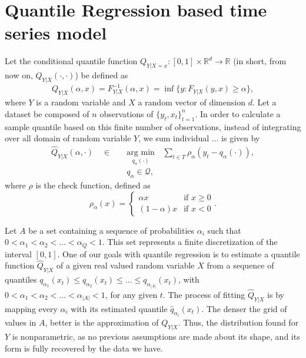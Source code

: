 \section{Quantile Regression based time series model}

Let the conditional quantile function $Q_{Y|X=x}:[0,1] \times \mathbb{R}^d \rightarrow \mathbb{R}$ (in short, from now on, $Q_{Y|X}(\cdot, \cdot)$) be defined as 
\begin{equation}
Q_{Y|X}(\alpha,x) = F_{Y|X}^{-1}(\alpha,x) = \inf\{y: F_{Y|X}(y,x) \geq \alpha\},
\label{eq:quantile-function}
\end{equation}
where $Y$ is a random variable and $X$ a random vector of dimension $d$. 
Let a dataset be composed of $n$ observations of $\{y_t,x_t \}_{t=1}^n$. In order to calculate a sample quantile based on this finite number of observations, instead of integrating over all domain of random variable $Y$, we sum individual ... is given by 
\begin{eqnarray}
\hat{Q}_{Y|X}(\alpha,\cdot)\quad\in\quad & \underset{q_{\alpha}(\cdot)}{\text{arg min}}\, & \sum_{t\in T}\rho_{\alpha}(y_{t}-q_{\alpha}(\cdot)),\label{eq:optim-qr1} \\
 & q_{\alpha}\in\mathcal{Q},\label{eq:optim-qr2}
\end{eqnarray}
where $\rho$ is the check function, defined as
\begin{equation}\label{eq:check-function}
\rho_{\alpha}(x)=\begin{cases}
\alpha x & \text{if }x\geq0\\
(1-\alpha)x & \text{if }x<0
\end{cases}.
\end{equation}



Let $A$ be a set containing a sequence of probabilities  $\alpha_i$ such that $0 < \alpha_1 < \alpha_2 < \dots < \alpha_Q < 1$. This set represents a finite discretization of the interval $[0,1]$.
One of our goals with quantile regression is to estimate a quantile function $\hat{Q}_{Y|X}$ of a given real valued random variable $X$ from a sequence of quantiles $q_{\alpha_1}(x_t) \leq q_{\alpha_2}(x_t) \leq \dots \leq q_{\alpha_{|A|}}(x_t)$, with $0 < \alpha_1 < \alpha_2 < \dots < \alpha_{|A|} < 1$, for any given $t$.
The process of fitting $\hat{Q}_{Y|X}$ is by mapping every $\alpha_i$ with its estimated quantile $\hat{q}_{\alpha_i}(x_t)$.
The denser the grid of values in $A$, better is the approximation of $Q_{Y|X}$.
Thus, the distribution found for $Y$ is nonparametric, as no previous assumptions are made about its shape, and its form is fully recovered by the data we have.

